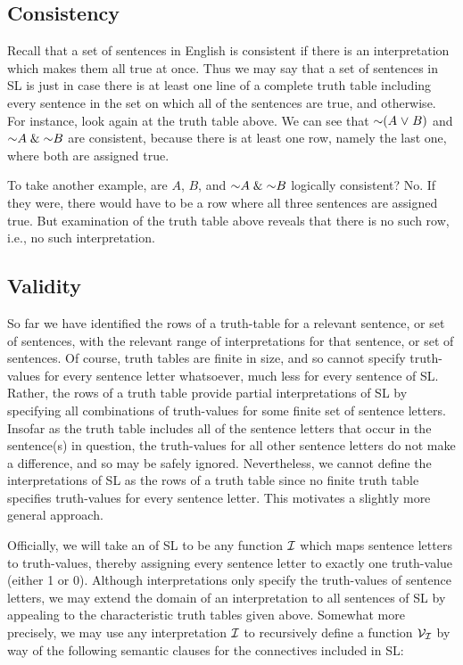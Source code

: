 \subsection{Consistency}
\label{sub:consistency}

Recall that a set of sentences in English is consistent if there is an interpretation which makes them all true at once.
Thus we may say that a set of sentences in SL is  just in case there is at least one line of a complete truth table including every sentence in the set on which all of the sentences are true, and  otherwise.
For instance, look again at the truth table above.
We can see that $\enot(A \eor B)$ and $\enot A \eand \enot B$ are consistent, because there is at least one row, namely the last one, where both are assigned true.

To take another example, are $A$, $B$, and $\enot A \eand \enot B$ logically consistent?
No.
If they were, there would have to be a row where all three sentences are assigned true.
But examination of the truth table above reveals that there is no such row, i.e., no such interpretation.





\subsection{Validity}
\label{sub:validity}
 
So far we have identified the rows of a truth-table for a relevant sentence, or set of sentences, with the relevant range of interpretations for that sentence, or set of sentences.
Of course, truth tables are finite in size, and so cannot specify truth-values for every sentence letter whatsoever, much less for every sentence of SL.
Rather, the rows of a truth table provide partial interpretations of SL by specifying all combinations of truth-values for some finite set of sentence letters.
Insofar as the truth table includes all of the sentence letters that occur in the sentence(s) in question, the truth-values for all other sentence letters do not make a difference, and so may be safely ignored.
Nevertheless, we cannot define the interpretations of SL as the rows of a truth table since no finite truth table specifies truth-values for every sentence letter.
This motivates a slightly more general approach.

Officially, we will take an  of SL to be any function $\mathcal{I}$ which maps sentence letters to truth-values, thereby assigning every sentence letter to exactly one truth-value (either 1 or 0).
Although interpretations only specify the truth-values of sentence letters, we may extend the domain of an interpretation to all sentences of SL by appealing to the characteristic truth tables given above.
Somewhat more precisely, we may use any interpretation $\mathcal{I}$ to recursively define a  function $\mathcal{V}_{\mathcal{I}}$ by way of the following semantic clauses for the connectives included in SL:

